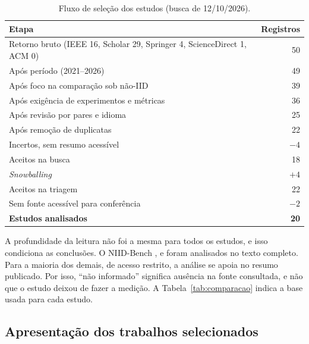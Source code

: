 \begin{table}[!b]
    \centering\small
    \caption{Fluxo de seleção dos estudos (busca de 12/10/2026).}
    \label{tab:fluxo}
    \begin{tabular}{@{}p{6.6cm}r@{}}
        \toprule
        Etapa & Registros \\
        \midrule
        Retorno bruto (IEEE 16, Scholar 29, Springer 4, ScienceDirect 1, ACM 0) & 50 \\
        Após período (2021--2026) & 49 \\
        Após foco na comparação sob não-IID & 39 \\
        Após exigência de experimentos e métricas & 36 \\
        Após revisão por pares e idioma & 25 \\
        Após remoção de duplicatas & 22 \\
        Incertos, sem resumo acessível & $-4$ \\
        Aceitos na busca & 18 \\
        \textit{Snowballing} & $+4$ \\
        \midrule
        Aceitos na triagem & 22 \\
        Sem fonte acessível para conferência & $-2$ \\
        \midrule
        \textbf{Estudos analisados} & \textbf{20} \\
        \bottomrule
    \end{tabular}
\end{table}

A profundidade da leitura não foi a mesma para todos os estudos, e isso condiciona as conclusões. O NIID-Bench \citep{li2022niidbench}, \citet{quintana2026mammography} e \citet{marella2025fedonco} foram analisados no texto completo. Para a maioria dos demais, de acesso restrito, a análise se apoia no resumo publicado. Por isso, ``não informado'' significa ausência na fonte consultada, e não que o estudo deixou de fazer a medição. A Tabela~\ref{tab:comparacao} indica a base usada para cada estudo.

\subsection{Apresentação dos trabalhos selecionados}

